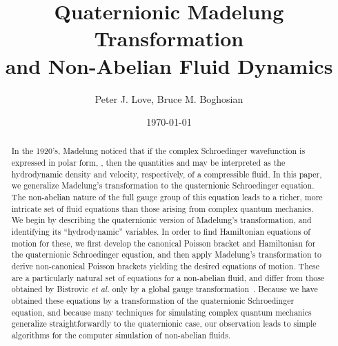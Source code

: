 \documentclass[a4paper,aps,prd,preprint,groupedaddress]{revtex4}
\providecommand{\bfu}{{\bf u}}
\providecommand{\bfnabla}{{\mbox{\boldmath \myHighlight{$\nabla$}\coordHE{}}}}
\begin{document}
\title{Quaternionic Madelung Transformation\\ and Non-Abelian Fluid Dynamics}


\author{Peter J. Love, Bruce M. Boghosian}

\date{\today}

\begin{abstract}
In the 1920's, Madelung noticed that if the complex Schroedinger wavefunction is expressed in polar form, \coordHE{}, then the quantities \coordHE{} and \myHighlight{$\bfu = \bfnabla\theta$}\coordHE{} may be interpreted as the hydrodynamic density and velocity, respectively,  of a compressible fluid.  In this paper, we generalize Madelung's transformation to the quaternionic Schroedinger equation. The non-abelian nature of the full \coordHE{} gauge group of this equation leads to a richer, more intricate set of fluid equations than those arising from complex quantum mechanics. We begin by describing the quaternionic version of Madelung's transformation, and identifying its ``hydrodynamic'' variables. In order to find Hamiltonian equations of motion for these, we first develop the canonical Poisson bracket and Hamiltonian for the quaternionic Schroedinger equation, and then apply Madelung's transformation to derive non-canonical Poisson brackets yielding the desired equations of motion. These are a particularly natural set of equations for a non-abelian fluid, and differ from those obtained by Bistrovic {\it et al.} only by a global gauge transformation~\cite{bib:jackiw2}. Because we have obtained these equations by a transformation of the quaternionic Schroedinger equation, and because many techniques for simulating complex quantum mechanics generalize straightforwardly to the quaternionic case,  our observation leads to simple algorithms for the computer simulation of non-abelian fluids.
\end{abstract}

\pacs{}

\maketitle



%



%
\end{document}

